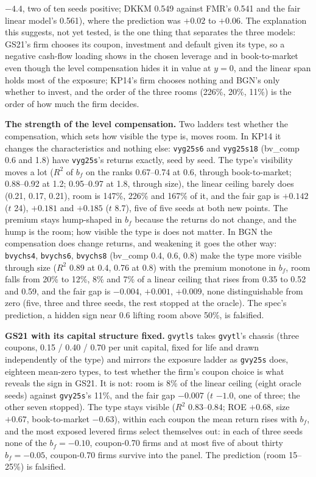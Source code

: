 $-4.4$, two of ten seeds positive; DKKM 0.549 against FMR's 0.541 and the fair linear model's 0.561), where the prediction was $+0.02$ to $+0.06$. The explanation this suggests, not yet tested, is the one thing that separates the three models: GS21's firm chooses its coupon, investment and default given its type, so a negative cash-flow loading shows in the chosen leverage and in book-to-market even though the level compensation hides it in value at $y=0$, and the linear span holds most of the exposure; KP14's firm chooses nothing and BGN's only whether to invest, and the order of the three rooms (226\%, 20\%, 11\%) is the order of how much the firm decides.

\noindent\textbf{The strength of the level compensation.} Two ladders test whether the compensation, which sets how visible the type is, moves room. In KP14 it changes the characteristics and nothing else: \texttt{vyg25s6} and \texttt{vyg25s18} (bv\_comp 0.6 and 1.8) have \texttt{vyg25s}'s returns exactly, seed by seed. The type's visibility moves a lot ($R^2$ of $b_f$ on the ranks 0.67--0.74 at 0.6, through book-to-market; 0.88--0.92 at 1.2; 0.95--0.97 at 1.8, through size), the linear ceiling barely does (0.21, 0.17, 0.21), room is 147\%, 226\% and 167\% of it, and the fair gap is $+0.142$ ($t$ 24), $+0.181$ and $+0.185$ ($t$ 8.7), five of five seeds at both new points. The premium stays hump-shaped in $b_f$ because the returns do not change, and the hump is the room; how visible the type is does not matter. In BGN the compensation does change returns, and weakening it goes the other way: \texttt{bvychs4}, \texttt{bvychs6}, \texttt{bvychs8} (bv\_comp 0.4, 0.6, 0.8) make the type more visible through size ($R^2$ 0.89 at 0.4, 0.76 at 0.8) with the premium monotone in $b_f$, room falls from 20\% to 12\%, 8\% and 7\% of a linear ceiling that rises from 0.35 to 0.52 and 0.59, and the fair gap is $-0.004$, $+0.001$, $+0.009$, none distinguishable from zero (five, three and three seeds, the rest stopped at the oracle). The spec's prediction, a hidden sign near 0.6 lifting room above 50\%, is falsified.

\noindent\textbf{GS21 with its capital structure fixed.} \texttt{gvytls} takes \texttt{gvytl}'s chassis (three coupons, 0.15 / 0.40 / 0.70 per unit capital, fixed for life and drawn independently of the type) and mirrors the exposure ladder as \texttt{gvy25s} does, eighteen mean-zero types, to test whether the firm's coupon choice is what reveals the sign in GS21. It is not: room is 8\% of the linear ceiling (eight oracle seeds) against \texttt{gvy25s}'s 11\%, and the fair gap $-0.007$ ($t$ $-1.0$, one of three; the other seven stopped). The type stays visible ($R^2$ 0.83--0.84; ROE $+0.68$, size $+0.67$, book-to-market $-0.63$), within each coupon the mean return rises with $b_f$, and the most exposed levered firms select themselves out: in each of three seeds none of the $b_f=-0.10$, coupon-0.70 firms and at most five of about thirty $b_f=-0.05$, coupon-0.70 firms survive into the panel. The prediction (room 15--25\%) is falsified.

